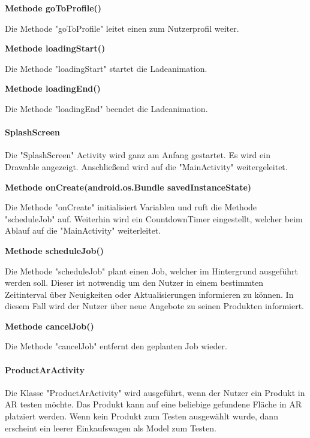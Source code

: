 \documentclass{scrartcl}
\begin{document}
\noindent\textbf{Methode goToProfile()}

\noindent Die Methode "goToProfile" leitet einen zum Nutzerprofil weiter. \newline

\noindent\textbf{Methode loadingStart()}

\noindent Die Methode "loadingStart" startet die Ladeanimation. \newline

\noindent\textbf{Methode loadingEnd()}

\noindent Die Methode "loadingEnd" beendet die Ladeanimation. \newline

\newpage

\paragraph{SplashScreen}

Die "SplashScreen" Activity wird ganz am Anfang gestartet. Es wird ein Drawable angezeigt. Anschließend wird auf die "MainActivity" weitergeleitet. \newline

\noindent\textbf{Methode onCreate(android.os.Bundle savedInstanceState)}

\noindent Die Methode "onCreate" initialisiert Variablen und ruft die Methode "scheduleJob" auf. Weiterhin wird ein CountdownTimer eingestellt, welcher beim Ablauf auf die "MainActivity" weiterleitet. \newline

\noindent\textbf{Methode scheduleJob()}

\noindent Die Methode "scheduleJob" plant einen Job, welcher im Hintergrund ausgeführt werden soll. Dieser ist notwendig um den Nutzer in einem bestimmten Zeitinterval über Neuigkeiten oder Aktualisierungen informieren zu können. In diesem Fall wird der Nutzer über neue Angebote zu seinen Produkten informiert. \newline

\noindent\textbf{Methode cancelJob()}

\noindent Die Methode "cancelJob" entfernt den geplanten Job wieder. \newline

\newpage

\paragraph{ProductArActivity} Die Klasse "ProductArActivity" wird ausgeführt, wenn der Nutzer ein Produkt in AR testen möchte. Das Produkt kann auf eine beliebige gefundene Fläche in AR platziert werden. Wenn kein Produkt zum Testen ausgewählt wurde, dann erscheint ein leerer Einkaufswagen als Model zum Testen. \newline
\end{document}
